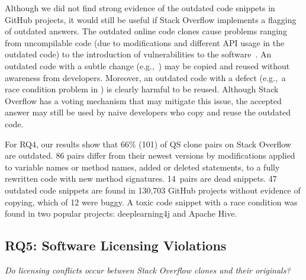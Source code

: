 \documentclass[10pt,journal,compsoc]{IEEEtran}
\newenvironment{boxquote}{\vspace{-1ex}\setlength{\FrameSep}{1\fboxsep}\begin{framed}\setlength{\parskip}{0.5\baselineskip}\setlength{\parindent}{0pt}}{\end{framed}}
\begin{document}
Although we did not find strong evidence of the outdated code snippets in GitHub
projects, it would still be useful if Stack Overflow implements a flagging of
outdated answers. The outdated online code clones cause problems ranging from
uncompilable code (due to modifications and different API usage in the outdated
code) to the introduction of vulnerabilities to the software~\cite{Xia2014}. An
outdated code with a subtle change (e.g.,\ ) may be copied
and reused without awareness from developers. Moreover, an outdated code with a
defect (e.g.,\ a race condition problem in ) is clearly
harmful to be reused. Although Stack Overflow has a voting mechanism that may
mitigate this issue, the accepted answer may still be used by naive developers
who copy and reuse the outdated code.

\begin{boxquote}
For RQ4, our results show that 66\% (101) of QS clone pairs on Stack
Overflow are outdated. 86 pairs differ from their newest versions by
modifications applied to variable names or method names, added or deleted
statements, to a fully rewritten code with new method signatures. 14~pairs are
dead snippets. 47 outdated code snippets are found in 130,703 GitHub projects
without evidence of copying, which of 12 were buggy. A toxic 
code snippet with a race condition was found in two popular projects: deeplearning4j and Apache Hive.
\end{boxquote}

\subsection{RQ5: Software Licensing Violations}
\vspace{0.25cm}
\textit{Do
	licensing conflicts occur between Stack Overflow clones and their
	originals?}
\vspace{0.25cm}
\end{document}
